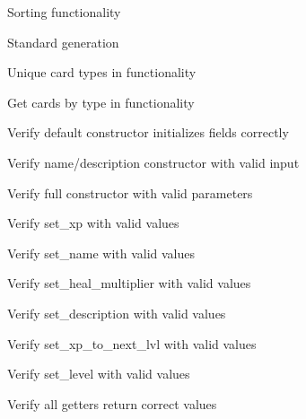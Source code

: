 \begin{DoxyRefList}
\label{test__test000062}%
%
Sorting  functionality  



\label{test__test000063}%
%
Standard  generation  



\label{test__test000064}%
%
Unique card types in  functionality  



\label{test__test000065}%
%
Get cards by type in  functionality  



\label{test__test000068}%
%
Verify default constructor initializes fields correctly  



\label{test__test000069}%
%
Verify name/description constructor with valid input  



\label{test__test000072}%
%
Verify full constructor with valid parameters  



\label{test__test000077}%
%
Verify set\+\_\+xp with valid values  



\label{test__test000079}%
%
Verify set\+\_\+name with valid values  



\label{test__test000081}%
%
Verify set\+\_\+heal\+\_\+multiplier with valid values  



\label{test__test000083}%
%
Verify set\+\_\+description with valid values  



\label{test__test000085}%
%
Verify set\+\_\+xp\+\_\+to\+\_\+next\+\_\+lvl with valid values  



\label{test__test000087}%
%
Verify set\+\_\+level with valid values  



\label{test__test000089}%
%
Verify all getters return correct values  




\end{DoxyRefList}
